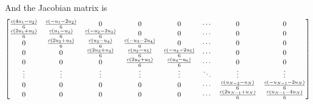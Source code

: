 And the Jacobian matrix is
\begin{equation}
  \begin{bmatrix}
    \frac{c\left( 4u_{1}-u_{2} \right)}{6} & \frac{c\left( -u_{1}-2u_{2} \right)}{6} & 0 & 0 & 0 & \cdots & 0 & 0 \\
    \frac{c\left( 2u_{1}+u_{2} \right)}{6} & \frac{c\left( u_{1}-u_{3} \right)}{6} &  \frac{c\left( -u_{2}-2u_{3} \right)}{6} & 0 & 0 & \cdots & 0 & 0 \\
    0 & \frac{c\left( 2u_{2}+u_{3} \right)}{6} & \frac{c\left( u_{2}-u_{4} \right)}{6} &  \frac{c\left( -u_{3}-2u_{4} \right)}{6} & 0 & \cdots & 0 & 0 \\
    0 & 0 & \frac{c\left( 2u_{3}+u_{4} \right)}{6} & \frac{c\left( u_{3}-u_{5} \right)}{6} &  \frac{c\left( -u_{4}-2u_{5} \right)}{6} & \cdots & 0 & 0 \\
    0 & 0 & 0 & \frac{c\left( 2u_{4}+u_{5} \right)}{6} & \frac{c\left( u_{4}-u_{6} \right)}{6} & \cdots & 0 & 0 \\
    \vdots & \vdots & \vdots & \vdots & \vdots & \ddots & \vdots & \vdots \\
    0 & 0 & 0 & 0 & 0 & \cdots & \frac{c\left( u_{N-2}-u_{N} \right)}{6} & \frac{c\left( -u_{N-1}-2u_{N} \right)}{6} \\
    0 & 0 & 0 & 0 & 0 & \cdots & \frac{c\left( 2u_{N-1}+u_{N} \right)}{6} & \frac{c\left( u_{N-1}-4u_{N} \right)}{6}
  \end{bmatrix}
\end{equation}

